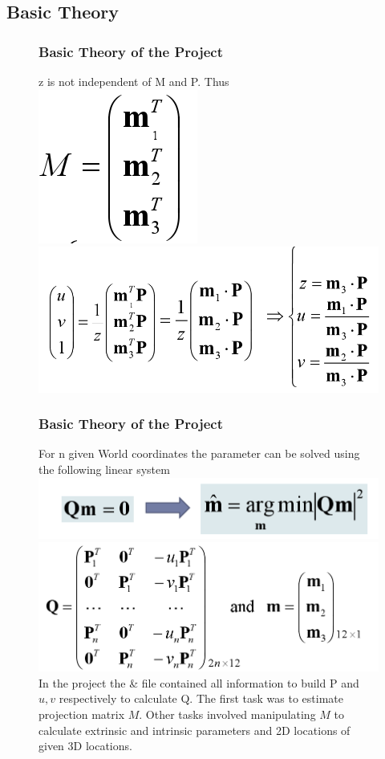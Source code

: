 \documentclass[11pt]{beamer}
\begin{document}
\subsection{Basic Theory}
\begin{frame}
\begin{figure}
\centering
\frametitle{Basic Theory of the Project}
z is not independent of M and P. Thus\vfill
\includegraphics[width=.24\textwidth]{m123.png}\vfill
\includegraphics[width=.7\textwidth]{u_v.png}
\end{figure}
\end{frame}

\begin{frame}
\begin{figure}
\centering
\frametitle{Basic Theory of the Project}
For n given World coordinates the parameter can be solved using the following linear system\vfill
\includegraphics[width=.5\textwidth]{opt_M.png}\vfill
\includegraphics[width=.7\textwidth]{Q.png}\vfill
In the project the  \&  file contained all information to build P and $u,v$ respectively to calculate Q. The first task was to estimate projection matrix $M$. Other tasks involved manipulating $M$ to calculate extrinsic and intrinsic parameters and 2D locations of given 3D locations. 
\end{figure}
\end{frame}
\end{document}
